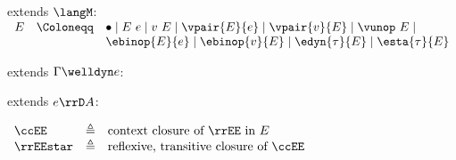 \begin{flushleft}

 extends $\langM$:
$\begin{array}{l c l}
  E & \Coloneqq & \bullet \mid E~e \mid v~E \mid
                  \vpair{E}{e} \mid \vpair{v}{E} \mid \vunop~E \mid
\\ & &            \ebinop{E}{e} \mid \ebinop{v}{E} \mid \edyn{\tau}{E} \mid \esta{\tau}{E}
\end{array}$

\medskip
{} extends $\Gamma \welldyn e$:\\
\begin{mathpar}


\end{mathpar}

\medskip
{} extends $e \rrD A$:\\
\begin{mathpar}


\end{mathpar}

\medskip
$\begin{array}{l c l}
  \ccEE & \triangleq & \mbox{context closure of $\rrEE$ in $E$}
\\
  \rrEEstar & \triangleq & \mbox{reflexive, transitive closure of $\ccEE$}
\end{array}$


\end{flushleft}
